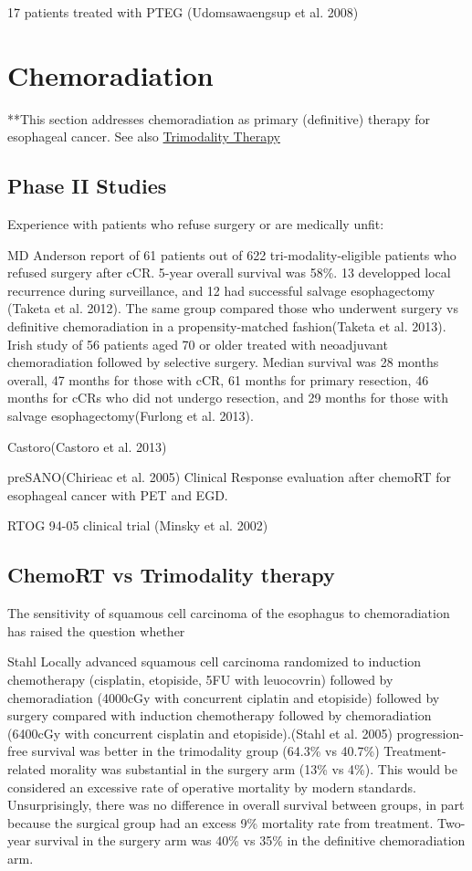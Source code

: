 \documentclass[
  letterpaper,
]{scrbook}
\begin{document}
17 patients treated with PTEG (Udomsawaengsup et al. 2008)

\chapter{Chemoradiation}\label{eso_dcrt}

**This section addresses chemoradiation as primary (definitive) therapy
for esophageal cancer. See also \hyperref[trimodality]{Trimodality
Therapy}

\section{Phase II Studies}\label{phase-ii-studies}

Experience with patients who refuse surgery or are medically unfit:

MD Anderson report of 61 patients out of 622 tri-modality-eligible
patients who refused surgery after cCR. 5-year overall survival was
58\%. 13 developped local recurrence during surveillance, and 12 had
successful salvage esophagectomy (Taketa et al. 2012). The same group
compared those who underwent surgery vs definitive chemoradiation in a
propensity-matched fashion(Taketa et al. 2013). Irish study of 56
patients aged 70 or older treated with neoadjuvant chemoradiation
followed by selective surgery. Median survival was 28 months overall, 47
months for those with cCR, 61 months for primary resection, 46 months
for cCRs who did not undergo resection, and 29 months for those with
salvage esophagectomy(Furlong et al. 2013).

Castoro(Castoro et al. 2013)

preSANO(Chirieac et al. 2005) Clinical Response evaluation after chemoRT
for esophageal cancer with PET and EGD.

RTOG 94-05 clinical trial (Minsky et al. 2002)

\section{ChemoRT vs Trimodality
therapy}\label{chemort-vs-trimodality-therapy}

The sensitivity of squamous cell carcinoma of the esophagus to
chemoradiation has raised the question whether

Stahl Locally advanced squamous cell carcinoma randomized to induction
chemotherapy (cisplatin, etopiside, 5FU with leuocovrin) followed by
chemoradiation (4000cGy with concurrent ciplatin and etopiside) followed
by surgery compared with induction chemotherapy followed by
chemoradiation (6400cGy with concurrent cisplatin and etopiside).(Stahl
et al. 2005) progression-free survival was better in the trimodality
group (64.3\% vs 40.7\%) Treatment-related morality was substantial in
the surgery arm (13\% vs 4\%). This would be considered an excessive
rate of operative mortality by modern standards. Unsurprisingly, there
was no difference in overall survival between groups, in part because
the surgical group had an excess 9\% mortality rate from treatment.
Two-year survival in the surgery arm was 40\% vs 35\% in the definitive
chemoradiation arm.
\end{document}

